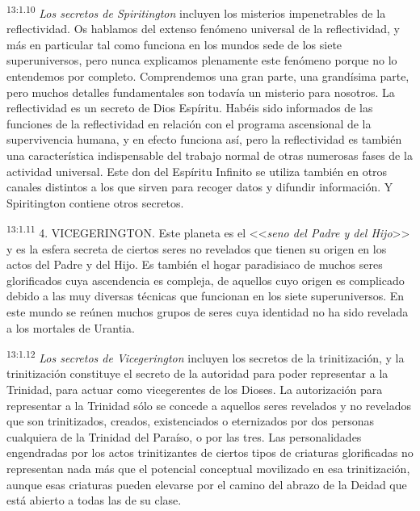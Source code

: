 \par
\textsuperscript{13:1.10} \textit{Los secretos de Spiritington} incluyen los misterios impenetrables de la reflectividad. Os hablamos del extenso fenómeno universal de la reflectividad, y más en particular tal como funciona en los mundos sede de los siete superuniversos, pero nunca explicamos plenamente este fenómeno porque no lo entendemos por completo. Comprendemos una gran parte, una grandísima parte, pero muchos detalles fundamentales son todavía un misterio para nosotros. La reflectividad es un secreto de Dios Espíritu. Habéis sido informados de las funciones de la reflectividad en relación con el programa ascensional de la supervivencia humana, y en efecto funciona así, pero la reflectividad es también una característica indispensable del trabajo normal de otras numerosas fases de la actividad universal. Este don del Espíritu Infinito se utiliza también en otros canales distintos a los que sirven para recoger datos y difundir información. Y Spiritington contiene otros secretos.

\par
\textsuperscript{13:1.11} 4. VICEGERINGTON. Este planeta es el <<\textit{seno del Padre y del Hijo}>> y es la esfera secreta de ciertos seres no revelados que tienen su origen en los actos del Padre y del Hijo. Es también el hogar paradisiaco de muchos seres glorificados cuya ascendencia es compleja, de aquellos cuyo origen es complicado debido a las muy diversas técnicas que funcionan en los siete superuniversos. En este mundo se reúnen muchos grupos de seres cuya identidad no ha sido revelada a los mortales de Urantia.

\par
\textsuperscript{13:1.12} \textit{Los secretos de Vicegerington} incluyen los secretos de la trinitización, y la trinitización constituye el secreto de la autoridad para poder representar a la Trinidad, para actuar como vicegerentes de los Dioses. La autorización para representar a la Trinidad sólo se concede a aquellos seres revelados y no revelados que son trinitizados, creados, existenciados o eternizados por dos personas cualquiera de la Trinidad del Paraíso, o por las tres. Las personalidades engendradas por los actos trinitizantes de ciertos tipos de criaturas glorificadas no representan nada más que el potencial conceptual movilizado en esa trinitización, aunque esas criaturas pueden elevarse por el camino del abrazo de la Deidad que está abierto a todas las de su clase.

